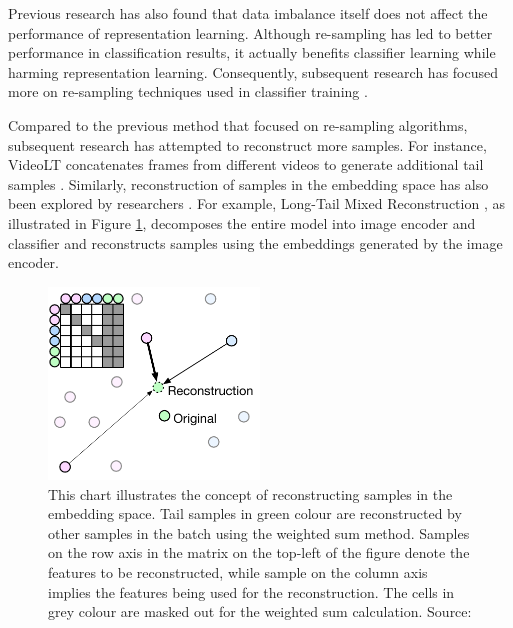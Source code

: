 Previous research has also found that data imbalance itself does not affect the performance of representation learning. Although re-sampling has led to better performance in classification results, it actually benefits classifier learning while harming representation learning. Consequently, subsequent research has focused more on re-sampling techniques used in classifier training \parencite{zhou2020bbn, kang2019decoupling}.

Compared to the previous method that focused on re-sampling algorithms, subsequent research has attempted to reconstruct more samples. For instance, VideoLT concatenates frames from different videos to generate additional tail samples \parencite{zhang2021videolt}. Similarly, reconstruction of samples in the embedding space has also been explored by researchers \parencite{liu2022long, perrett2023use}. For example, Long-Tail Mixed Reconstruction \parencite{perrett2023use}, as illustrated in Figure \ref{fig:augembedding}, decomposes the entire model into image encoder and classifier and reconstructs samples using the embeddings generated by the image encoder.

\begin{figure}[ht]
    \centering
    \includegraphics[width=0.5\textwidth]{assets/charts_rw/AugEmbedding}
    \caption[Illustration of Reconstruction of Samples in the Embedding Space]{This chart illustrates the concept of reconstructing samples in the embedding space. Tail samples in green colour are reconstructed by other samples in the batch using the weighted sum method. Samples on the row axis in the matrix on the top-left of the figure denote the features to be reconstructed, while sample on the column axis implies the features being used for the reconstruction. The cells in grey colour are masked out for the weighted sum calculation. Source: \parencite{perrett2023use}}
    \label{fig:augembedding}
\end{figure}

